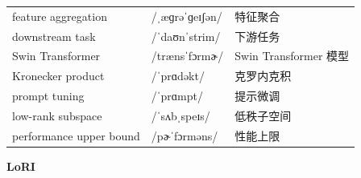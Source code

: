 \documentclass[UTF8,12pt,a4paper]{ctexart}
\providecommand{\zh}[1]{#1}
\begin{document}
\begin{tabular*}{\textwidth}{@{\extracolsep{\fill}}lll@{}}
feature aggregation & {\ipafont /ˌæɡrəˈɡeɪʃən/} & \zh{特征聚合} \\
downstream task & {\ipafont /ˈdaʊnˈstrim/} & \zh{下游任务} \\
Swin Transformer & {\ipafont /trænsˈfɔrmɚ/} & \zh{Swin Transformer 模型} \\
Kronecker product & {\ipafont /ˈprɑdəkt/} & \zh{克罗内克积} \\
prompt tuning & {\ipafont /ˈprɑmpt/} & \zh{提示微调} \\
low-rank subspace & {\ipafont /ˈsʌbˌspeɪs/} & \zh{低秩子空间} \\
performance upper bound & {\ipafont /pɚˈfɔrməns/} & \zh{性能上限} \\
\bottomrule
\end{tabular*}

\newpage

\begin{center}
    {\Large\bfseries LoRI}
\end{center}
\end{document}
